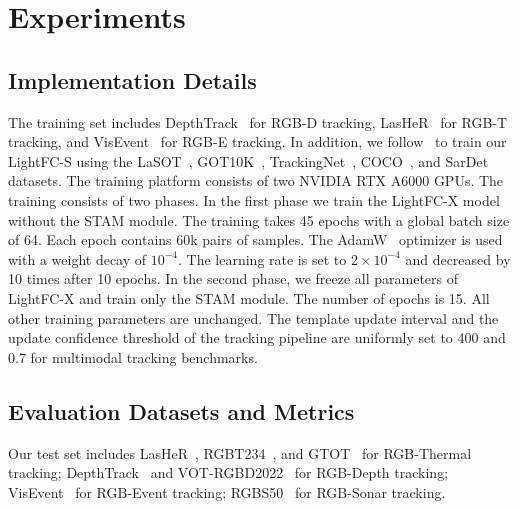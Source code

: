 \section{Experiments}
\label{sec:experiment}
















\subsection{Implementation Details}
The training set includes DepthTrack~\cite{depthtrack} for RGB-D tracking, LasHeR~\cite{lasher} for RGB-T tracking, and VisEvent~\cite{visevent} for RGB-E tracking. In addition, we follow~\cite{rgbs50} to train our LightFC-S using the LaSOT~\cite{lasot}, GOT10K~\cite{got10k}, TrackingNet~\cite{trackingnet}, COCO~\cite{coco}, and SarDet~\cite{sardet} datasets. The training platform consists of two NVIDIA RTX A6000 GPUs. The training consists of two phases. In the first phase we train the LightFC-X model without the STAM module. The training takes 45 epochs with a global batch size of 64. Each epoch contains 60k pairs of samples. The AdamW~\cite{adamw} optimizer is used with a weight decay of $10^{-4}$. The learning rate is set to $2\times 10^{-4}$ and decreased by 10 times after 10 epochs. In the second phase, we freeze all parameters of LightFC-X and train only the STAM module. The number of epochs is 15. All other training parameters are unchanged. The template update interval and the update confidence threshold of the tracking pipeline are uniformly set to 400 and 0.7 for multimodal tracking benchmarks.




\subsection{Evaluation Datasets and Metrics}
Our test set includes LasHeR~\cite{lasher}, RGBT234~\cite{rgbt234}, and GTOT~\cite{gtot} for RGB-Thermal tracking; DepthTrack~\cite{depthtrack} and VOT-RGBD2022~\cite{vot22} for RGB-Depth tracking; VisEvent~\cite{visevent} for RGB-Event tracking;  RGBS50~\cite{rgbs50} for RGB-Sonar tracking.


